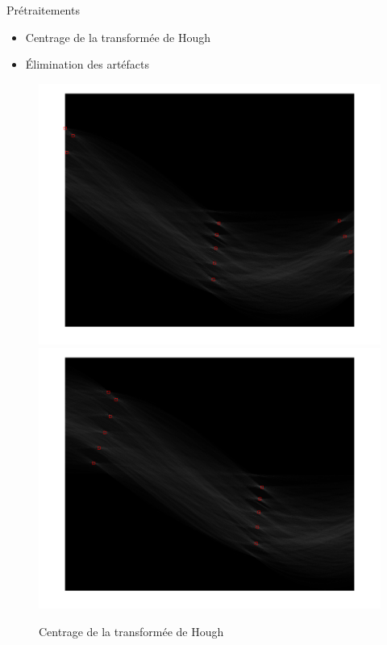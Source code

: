 \documentclass[11pt]{beamer}
\begin{document}
\begin{frame}{Prétraitements}
\begin{itemize}
	\item Centrage de la transformée de Hough
	\item Élimination des artéfacts
\end{itemize}

\begin{figure}[h]
\begin{center}
\includegraphics[width = 0.5 \columnwidth]{fig/centrageavt.png}
\includegraphics[width = 0.5 \columnwidth]{fig/centrageapres.png}
\caption{\label{centrage} Centrage de la transformée de Hough}
\end{center}
\end{figure}
\end{frame}
\end{document}
